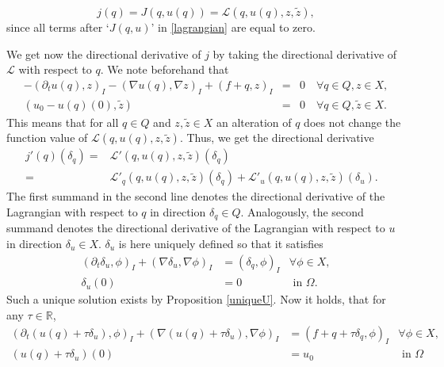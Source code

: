 \begin{displaymath}
j(q)=J(q, u(q))=\mathcal{L}(q,u(q),z,\tilde{z}),
\end{displaymath}
since all terms after `$J(q,u)$' in \eqref{lagrangian} are equal to zero.

We get now the directional derivative of $j$ by taking the directional derivative of $\mathcal{L}$ with respect to $q$. We note beforehand that 
\begin{eqnarray*}
-(\partial_tu(q),z)_I-(\nabla u(q), \nabla z)_I+(f+q, z)_I&=&0\quad\forall q\in Q, z\in X,\\
(u_0-u(q)(0), \tilde{z})&=&0\quad\forall q\in Q, \tilde{z}\in X.
\end{eqnarray*}
This means that for all $q\in Q$ and $z,\tilde{z}\in X$ an alteration of $q$ does not change the function value of $\mathcal{L}(q,u(q),z,\tilde{z})$. Thus, we get the directional derivative
\begin{equation}
\label{LagrangianDerivative}
\begin{aligned}
j'(q)(\delta_q)=&\mathcal{L}'(q,u(q),z,\tilde{z})(\delta_q)&\\
=&\mathcal{L}'_q(q, u(q), z, \tilde{z})(\delta_q)+\mathcal{L}'_u(q,u(q),z,\tilde{z})(\delta_u).&
\end{aligned}
\end{equation}
The first summand in the second line denotes the directional derivative of the Lagrangian with respect to $q$ in direction $\delta_q\in Q$. Analogously, the second summand denotes the directional derivative of the Lagrangian with respect to $u$ in direction $\delta_u\in X$. $\delta_u$ is here uniquely defined so that it satisfies
\begin{equation}
\label{deltaUEquations}
\begin{aligned}
	(\partial_t\delta_u,\phi)_I+(\nabla \delta_u,\nabla\phi)_I&=(\delta_q,\phi)_I&\forall\phi\in X,\\
	\delta_u(0)&=0&\text{ in }\Omega.
\end{aligned}
\end{equation}
Such a unique solution exists by Proposition \ref{uniqueU}. Now it holds, that for any $\tau\in\mathbb{R}$,
\begin{equation*}
\begin{aligned}
	(\partial_t(u(q)+\tau\delta_u),\phi)_I+(\nabla (u(q)+\tau\delta_u),\nabla\phi)_I&=(f+q+\tau\delta_q,\phi)_I&\forall\phi\in X,\\
	(u(q)+\tau\delta_u)(0)&=u_0&\text{ in }\Omega
\end{aligned}
\end{equation*}
